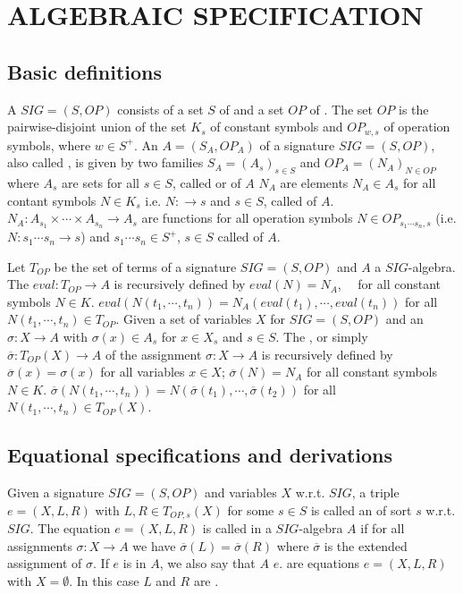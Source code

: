 \section{ALGEBRAIC SPECIFICATION}
\subsection{Basic definitions}
\bit
\w A  $SIG = (S, OP)$ consists of a set $S$ of  and a
set $OP$ of .
The set $OP$ is the pairwise-disjoint union of the set $K_s$ of constant
symbols and $OP_{w, s}$ of operation symbols, where $w \in S^+$.
\w An  $A = (S_A, OP_A)$ of a signature $SIG = (S, OP)$, also
called , is given by two families $S_A = (A_s)_{s \in S}$
and 
$OP_A = (N_A)_{N \in OP}$ where
  \ben
  \w [(a)] $A_s$ are sets for all $s \in S$, called  or
   of $A$
  \w [(b)] $N_A$ are elements $N_A \in A_s$ for all contant symbols $N \in
  K_s$ i.e. $N: \rightarrow s$ and $s \in S$, called  of $A$.
  \w [(c)] $N_A: A_{s_1} \times \cdots \times A_{s_n} \rightarrow A_s$ are
  functions for all operation symbols $N \in OP_{s_1\cdots{s_n},s}$ (i.e. $N:
  s_1\cdots s_n \rightarrow s$) and $s_1\cdots s_n \in S^+$, $s \in S$ called
   of $A$.
  \een

\w Let $T_{OP}$ be the set of terms of a signature $SIG = (S, OP)$ and $A$ a
$SIG$-algebra. The  $eval: T_{OP} \rightarrow A$ is recursively
defined by 
  \ben
  \w [(a)] $eval(N) = N_A$, \ \ for all constant symbols $N \in K$.
  \w [(b)] $eval(N(t_1, \cdots, t_n)) = N_A(eval(t_1), \cdots, eval(t_n))$ for
  all $N(t_1, \cdots, t_n) \in T_{OP}$. 
  \een
\w Given a set of variables $X$ for $SIG = (S, OP)$ and an 
$\sigma: X \rightarrow A$ with $\sigma(x) \in A_s$ for $x \in X_s$ and $s \in
S$. The , or simply  
$\overline{\sigma}: T_{OP}(X) \rightarrow A$ of the assignment $\sigma: X
\rightarrow A$ is recursively defined by 
  \ben
  \w [(a)] $\overline{\sigma}(x) = \sigma(x)$ for all variables $x \in X$;
     $\overline{\sigma}(N) = N_A$ for all constant symbols $N \in K$. 
  \w [(b)] $\overline{\sigma}(N(t_1, \cdots, t_n)) = 
      N(\overline{\sigma}(t_1), \cdots, \overline{\sigma}(t_2))$ for all $N(t_1,
      \cdots, t_n) \in T_{OP}(X)$. 
  \een
\eit

\subsection{Equational specifications and derivations}
\bit
\w Given a signature $SIG = (S, OP)$ and variables $X$ w.r.t. $SIG$,
a triple $e = (X, L, R)$ with $L, R \in T_{OP, s}(X)$ for some $s \in S$
is called an  of sort $s$ w.r.t. $SIG$.
\w The equation $e = (X, L, R)$ is called  in a $SIG$-algebra
 $A$ if for all assignments $\sigma: X \rightarrow A$ we have
$\overline{\sigma}(L) = \overline{\sigma}(R)$ where $\overline{\sigma}$
is the extended assignment of $\sigma$. 
\w If $e$ is  in $A$, we also say that $A$  $e$.
\w {} are equations $e = (X, L, R)$ with $X =
\emptyset$. In this case $L$ and $R$ are .
\eit

